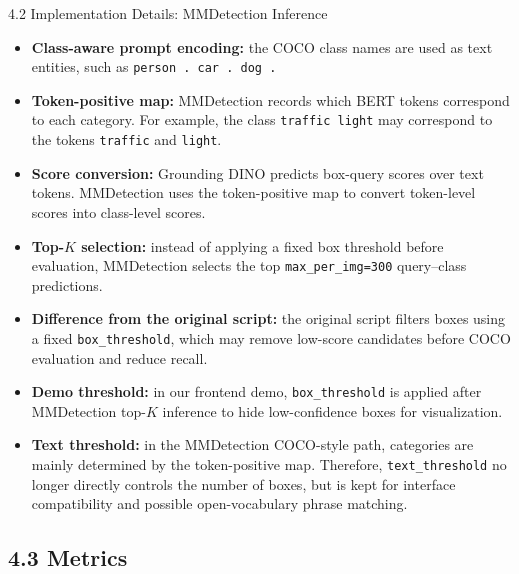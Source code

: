 \documentclass[aspectratio=169,10pt]{beamer}
\begin{document}
\begin{frame}{4.2 Implementation Details: MMDetection Inference}
\small
\begin{itemize}
    \item \textbf{Class-aware prompt encoding:} the COCO class names are used as text entities, such as \texttt{person . car . dog .}
    \item \textbf{Token-positive map:} MMDetection records which BERT tokens correspond to each category.
    For example, the class \texttt{traffic light} may correspond to the tokens \texttt{traffic} and \texttt{light}.
    \item \textbf{Score conversion:} Grounding DINO predicts box-query scores over text tokens.
    MMDetection uses the token-positive map to convert token-level scores into class-level scores.
    \item \textbf{Top-$K$ selection:} instead of applying a fixed box threshold before evaluation, MMDetection selects the top \texttt{max\_per\_img=300} query--class predictions.
    \item \textbf{Difference from the original script:} the original script filters boxes using a fixed \texttt{box\_threshold}, which may remove low-score candidates before COCO evaluation and reduce recall.
    \item \textbf{Demo threshold:} in our frontend demo, \texttt{box\_threshold} is applied after MMDetection top-$K$ inference to hide low-confidence boxes for visualization.
    \item \textbf{Text threshold:} in the MMDetection COCO-style path, categories are mainly determined by the token-positive map.
    Therefore, \texttt{text\_threshold} no longer directly controls the number of boxes, but is kept for interface compatibility and possible open-vocabulary phrase matching.
\end{itemize}
\end{frame}


\subsection{4.3 Metrics}
\end{document}
